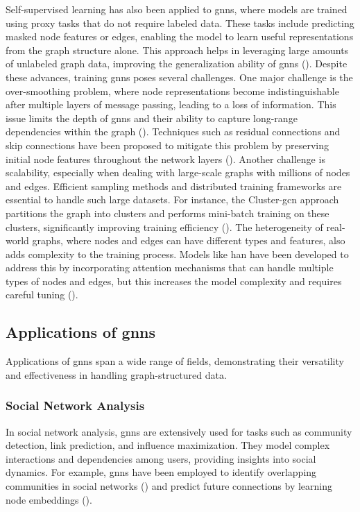 Self-supervised learning has also been applied to \glspl{gnn}, where models are trained using proxy tasks that do not require labeled data.
These tasks include predicting masked node features or edges, enabling the model to learn useful representations from the graph structure alone.
This approach helps in leveraging large amounts of unlabeled graph data, improving the generalization ability of \glspl{gnn} (\cite{Velickovic2018}).
Despite these advances, training \glspl{gnn} poses several challenges.
One major challenge is the over-smoothing problem, where node representations become indistinguishable after multiple layers of message passing, leading to a loss of information.
This issue limits the depth of \glspl{gnn} and their ability to capture long-range dependencies within the graph (\cite{Li2018}).
Techniques such as residual connections and skip connections have been proposed to mitigate this problem by preserving initial node features throughout the network layers (\cite{Xu2019}).
Another challenge is scalability, especially when dealing with large-scale graphs with millions of nodes and edges.
Efficient sampling methods and distributed training frameworks are essential to handle such large datasets.
For instance, the Cluster-\gls{gcn} approach partitions the graph into clusters and performs mini-batch training on these clusters, significantly improving training efficiency (\cite{Chiang2019}).
The heterogeneity of real-world graphs, where nodes and edges can have different types and features, also adds complexity to the training process.
Models like \gls{han} have been developed to address this by incorporating attention mechanisms that can handle multiple types of nodes and edges, but this increases the model complexity and requires careful tuning (\cite{Wang2019}).

\subsection*{Applications of \glspl{gnn}}
Applications of \glspl{gnn} span a wide range of fields, demonstrating their versatility and effectiveness in handling graph-structured data.

\subsubsection*{Social Network Analysis}
In social network analysis, \glspl{gnn} are extensively used for tasks such as community detection, link prediction, and influence maximization.
They model complex interactions and dependencies among users, providing insights into social dynamics.
For example, \glspl{gnn} have been employed to identify overlapping communities in social networks (\cite{Chen2017}) and predict future connections by learning node embeddings (\cite{Zeng2019}).

